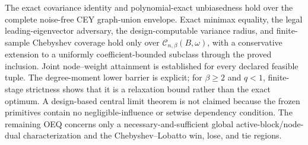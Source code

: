 The exact covariance identity and polynomial-exact unbiasedness hold over the complete noise-free CEY graph-union envelope.  Exact minimax equality, the legal leading-eigenvector adversary, the design-computable variance radius, and finite-sample Chebyshev coverage hold only over \(\mathcal C_{n,\beta}(B,\omega)\), with a conservative extension to a uniformly coefficient-bounded subclass through the proved inclusion.  Joint node--weight attainment is established for every declared feasible tuple.  The degree-moment lower barrier is explicit; for \(\beta\ge2\) and \(q<1\), finite-stage strictness shows that it is a relaxation bound rather than the exact optimum.  A design-based central limit theorem is not claimed because the frozen primitives contain no negligible-influence or setwise dependency condition.  The remaining OEQ concerns only a necessary-and-sufficient global active-block/node-dual characterization and the Chebyshev--Lobatto win, lose, and tie regions.